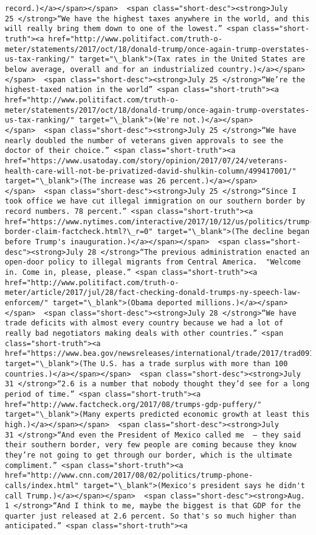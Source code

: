 \documentclass[11pt]{article}
\begin{document}
\begin{Verbatim}[commandchars=\\\{\}]
record.)</a></span></span>  <span class="short-desc"><strong>July 25 </strong>“We have the highest taxes anywhere in the world, and this will really bring them down to one of the lowest.” <span class="short-truth"><a href="http://www.politifact.com/truth-o-meter/statements/2017/oct/18/donald-trump/once-again-trump-overstates-us-tax-ranking/" target="\_blank">(Tax rates in the United States are below average, overall and for an industrialized country.)</a></span></span>  <span class="short-desc"><strong>July 25 </strong>“We’re the highest-taxed nation in the world” <span class="short-truth"><a href="http://www.politifact.com/truth-o-meter/statements/2017/oct/18/donald-trump/once-again-trump-overstates-us-tax-ranking/" target="\_blank">(We're not.)</a></span></span>  <span class="short-desc"><strong>July 25 </strong>“We have nearly doubled the number of veterans given approvals to see the doctor of their choice.” <span class="short-truth"><a href="https://www.usatoday.com/story/opinion/2017/07/24/veterans-health-care-will-not-be-privatized-david-shulkin-column/499417001/" target="\_blank">(The increase was 26 percent.)</a></span></span>  <span class="short-desc"><strong>July 25 </strong>“Since I took office we have cut illegal immigration on our southern border by record numbers. 78 percent.” <span class="short-truth"><a href="https://www.nytimes.com/interactive/2017/10/12/us/politics/trump-border-claim-factcheck.html?\_r=0" target="\_blank">(The decline began before Trump's inauguration.)</a></span></span>  <span class="short-desc"><strong>July 28 </strong>“The previous administration enacted an open-door policy to illegal migrants from Central America.  "Welcome in. Come in, please, please.” <span class="short-truth"><a href="http://www.politifact.com/truth-o-meter/article/2017/jul/28/fact-checking-donald-trumps-ny-speech-law-enforcem/" target="\_blank">(Obama deported millions.)</a></span></span>  <span class="short-desc"><strong>July 28 </strong>“We have trade deficits with almost every country because we had a lot of really bad negotiators making deals with other countries.” <span class="short-truth"><a href="https://www.bea.gov/newsreleases/international/trade/2017/trad0917.htm" target="\_blank">(The U.S. has a trade surplus with more than 100 countries.)</a></span></span>  <span class="short-desc"><strong>July 31 </strong>“2.6 is a number that nobody thought they’d see for a long period of time.” <span class="short-truth"><a href="http://www.factcheck.org/2017/08/trumps-gdp-puffery/" target="\_blank">(Many experts predicted economic growth at least this high.)</a></span></span>  <span class="short-desc"><strong>July 31 </strong>“And even the President of Mexico called me  – they said their southern border, very few people are coming because they know they’re not going to get through our border, which is the ultimate compliment.” <span class="short-truth"><a href="http://www.cnn.com/2017/08/02/politics/trump-phone-calls/index.html" target="\_blank">(Mexico's president says he didn't call Trump.)</a></span></span>  <span class="short-desc"><strong>Aug. 1 </strong>“And I think to me, maybe the biggest is that GDP for the quarter just released at 2.6 percent. So that's so much higher than anticipated.” <span class="short-truth"><a 
\end{Verbatim}
\end{document}
